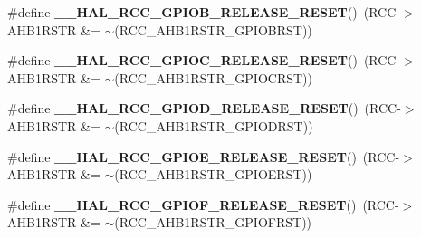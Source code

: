 \begin{DoxyCompactItemize}
\item 
\mbox{\label{group___r_c_c_ex___force___release___peripheral___reset_gaf03da3b36478071844fbd77df618a686}} 
\#define {\bfseries \+\_\+\+\_\+\+H\+A\+L\+\_\+\+R\+C\+C\+\_\+\+G\+P\+I\+O\+B\+\_\+\+R\+E\+L\+E\+A\+S\+E\+\_\+\+R\+E\+S\+ET}()~(R\+CC-\/$>$A\+H\+B1\+R\+S\+TR \&= $\sim$(R\+C\+C\+\_\+\+A\+H\+B1\+R\+S\+T\+R\+\_\+\+G\+P\+I\+O\+B\+R\+ST))
\item 
\mbox{\label{group___r_c_c_ex___force___release___peripheral___reset_ga1df0e3536d3450435bdccdbe9c878736}} 
\#define {\bfseries \+\_\+\+\_\+\+H\+A\+L\+\_\+\+R\+C\+C\+\_\+\+G\+P\+I\+O\+C\+\_\+\+R\+E\+L\+E\+A\+S\+E\+\_\+\+R\+E\+S\+ET}()~(R\+CC-\/$>$A\+H\+B1\+R\+S\+TR \&= $\sim$(R\+C\+C\+\_\+\+A\+H\+B1\+R\+S\+T\+R\+\_\+\+G\+P\+I\+O\+C\+R\+ST))
\item 
\mbox{\label{group___r_c_c_ex___force___release___peripheral___reset_ga29fbf71f71ea27ffa38e7283b6dce03d}} 
\#define {\bfseries \+\_\+\+\_\+\+H\+A\+L\+\_\+\+R\+C\+C\+\_\+\+G\+P\+I\+O\+D\+\_\+\+R\+E\+L\+E\+A\+S\+E\+\_\+\+R\+E\+S\+ET}()~(R\+CC-\/$>$A\+H\+B1\+R\+S\+TR \&= $\sim$(R\+C\+C\+\_\+\+A\+H\+B1\+R\+S\+T\+R\+\_\+\+G\+P\+I\+O\+D\+R\+ST))
\item 
\mbox{\label{group___r_c_c_ex___force___release___peripheral___reset_ga38fcc37f656d6f5e5698d9eb01d4c552}} 
\#define {\bfseries \+\_\+\+\_\+\+H\+A\+L\+\_\+\+R\+C\+C\+\_\+\+G\+P\+I\+O\+E\+\_\+\+R\+E\+L\+E\+A\+S\+E\+\_\+\+R\+E\+S\+ET}()~(R\+CC-\/$>$A\+H\+B1\+R\+S\+TR \&= $\sim$(R\+C\+C\+\_\+\+A\+H\+B1\+R\+S\+T\+R\+\_\+\+G\+P\+I\+O\+E\+R\+ST))
\item 
\mbox{\label{group___r_c_c_ex___force___release___peripheral___reset_ga9f9a67f57c0ca219d0cf0c2e07114f27}} 
\#define {\bfseries \+\_\+\+\_\+\+H\+A\+L\+\_\+\+R\+C\+C\+\_\+\+G\+P\+I\+O\+F\+\_\+\+R\+E\+L\+E\+A\+S\+E\+\_\+\+R\+E\+S\+ET}()~(R\+CC-\/$>$A\+H\+B1\+R\+S\+TR \&= $\sim$(R\+C\+C\+\_\+\+A\+H\+B1\+R\+S\+T\+R\+\_\+\+G\+P\+I\+O\+F\+R\+ST))
\item 
\mbox{\label{group___r_c_c_ex___force___release___peripheral___reset_gae5e39d5fdc6dee36bba521d096ca320d}} 

\end{DoxyCompactItemize}
